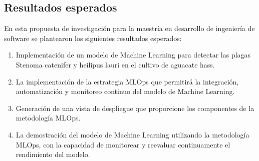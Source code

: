 \subsection{Resultados esperados}
En esta propuesta de investigación para la maestría en desarrollo de ingeniería de software se plantearon los siguientes resultados esperados:
\begin{enumerate}
  \item Implementación de un modelo de Machine Learning para detectar las plagas Stenoma catenifer y heilipus lauri en el cultivo de aguacate hass.
  \item La implementación de la estrategia MLOps que permitirá la integración, automatización y monitoreo continuo del modelo de Machine Learning. 
  \item Generación de una vista de despliegue que proporcione los componentes de la metodología MLOps.
  \item La demostración del modelo de Machine Learning utilizando la metodología MLOps, con la capacidad de monitorear y reevaluar continuamente el rendimiento del modelo.
\end{enumerate}